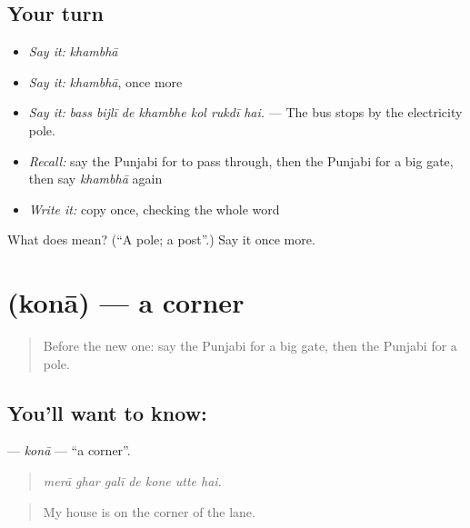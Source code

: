 \subsection*{Your turn}
\begin{itemize}
\raggedright
  \item \emph{Say it:} \emph{khambhā}
  \item \emph{Say it:} \emph{khambhā}, once more
  \item \emph{Say it:} \emph{bass bijlī de khambhe kol rukdī hai.} — The bus stops by the electricity pole.
  \item \emph{Recall:} say the Punjabi for to pass through, then the Punjabi for a big gate, then say \emph{khambhā} again
  \item \emph{Write it:} copy \textbf{} once, checking the whole word
\end{itemize}

\begin{tcolorbox}[breakable,colback=teal!4,colframe=teal!35!black,title={Before you move on}]
What does  mean? (\textquotedblleft{}A pole; a post\textquotedblright{}.) Say it once more.
\end{tcolorbox}
\section[\texorpdfstring{\pa{ਕੋਨਾ} (konā)}{ਕੋਨਾ (konā)}]{ (konā) — a corner}

\label{lesson:PA-C264-kona}



\begin{quote}
Before the new one: say the Punjabi for a big gate, then the Punjabi for a pole.
\end{quote}

\subsection*{You'll want to know: }
\textbf{} — \emph{konā} — \textquotedblleft{}a corner\textquotedblright{}.

\begin{quote}
      
\end{quote}

\begin{quote}
\emph{merā ghar galī de kone utte hai.}
\end{quote}

\begin{quote}
My house is on the corner of the lane.
\end{quote}

